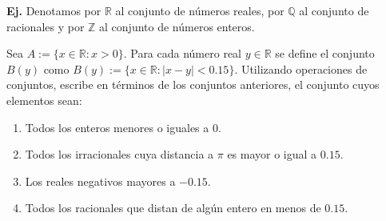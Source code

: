 \documentclass[letterpaper,DIV=14,headsepline,12pt]{scrartcl}
\newcounter{Ejer}
\newcommand{\pts}{}
\newenvironment{ejercicio}[1]{\noindent
    \ifthenelse{\equal{#1}{1} \OR \equal{#1}{+1}}{\renewcommand{\pts}{\textbf{(#1 pt)}}}{\renewcommand{\pts}{\textbf{(#1 pts)}}}\textbf{Ej. \theEjer} \pts\stepcounter{Ejer}}{\vspace{.3cm}}
\begin{document}
    





    \newpage
    \begin{ejercicio}{+1}
        Denotamos por $\mathbb{R}$ al conjunto de números reales, por $\mathbb{Q}$ al conjunto de racionales y por $\mathbb{Z}$ al conjunto de números enteros.

        Sea $A:=\{x \in \mathbb{R} : \text{$x > 0$} \}$. Para cada número real $y \in \mathbb{R}$ se define el conjunto $B(y)$ como $B(y):=\{x \in \mathbb{R} : |x-y|<0.15 \}$. Utilizando operaciones de conjuntos, escribe en términos de los conjuntos anteriores, el conjunto cuyos elementos sean:
        \begin{enumerate}
            \item Todos los enteros menores o iguales a $0$.
            \item Todos los irracionales cuya distancia a $\pi$ es mayor o igual a $0.15$.
            \item Los reales negativos mayores a $-0.15$.
            \item Todos los racionales que distan de algún entero en menos de $0.15$.
        \end{enumerate}
    \end{ejercicio}
\end{document}
